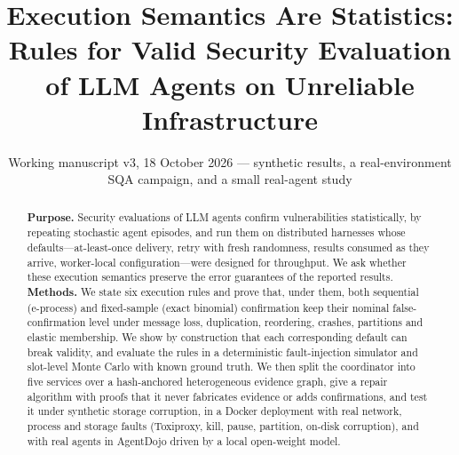\documentclass[11pt]{article}
\title{Execution Semantics Are Statistics:\\ Rules for Valid Security Evaluation of LLM Agents on Unreliable Infrastructure}
\author{\todo{AUTHORS AND AFFILIATIONS TO BE INSERTED}}
\date{Working manuscript v3, 18 October 2026 --- synthetic results, a real-environment SQA campaign, and a small real-agent study}
\theoremstyle{definition}
\begin{document}
\maketitle

\begin{abstract}
\noindent\textbf{Purpose.} Security evaluations of LLM agents confirm vulnerabilities statistically, by repeating stochastic agent episodes, and run them on distributed harnesses whose defaults---at-least-once delivery, retry with fresh randomness, results consumed as they arrive, worker-local configuration---were designed for throughput. We ask whether these execution semantics preserve the error guarantees of the reported results.
\textbf{Methods.} We state six execution rules and prove that, under them, both sequential (e-process) and fixed-sample (exact binomial) confirmation keep their nominal false-confirmation level under message loss, duplication, reordering, crashes, partitions and elastic membership. We show by construction that each corresponding default can break validity, and evaluate the rules in a deterministic fault-injection simulator and slot-level Monte Carlo with known ground truth. We then split the coordinator into five services over a hash-anchored heterogeneous evidence graph, give a repair algorithm with proofs that it never fabricates evidence or adds confirmations, and test it under synthetic storage corruption, in a Docker deployment with real network, process and storage faults (Toxiproxy, kill, pause, partition, on-disk corruption), and with real agents in AgentDojo driven by a local open-weight model.

\end{abstract}
\end{document}
